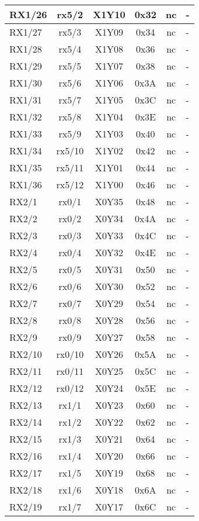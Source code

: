 \begin{longtable}{|l|c|c|c|c|l|}
RX1/26 & rx5/2  & X1Y10 & 0x32 & nc & -\\\hline
RX1/27 & rx5/3  & X1Y09 & 0x34 & nc & -\\\hline
RX1/28 & rx5/4  & X1Y08 & 0x36 & nc & -\\\hline
RX1/29 & rx5/5  & X1Y07 & 0x38 & nc & -\\\hline
RX1/30 & rx5/6  & X1Y06 & 0x3A & nc & -\\\hline
RX1/31 & rx5/7  & X1Y05 & 0x3C & nc & -\\\hline
RX1/32 & rx5/8  & X1Y04 & 0x3E & nc & -\\\hline
RX1/33 & rx5/9  & X1Y03 & 0x40 & nc & -\\\hline
RX1/34 & rx5/10 & X1Y02 & 0x42 & nc & -\\\hline
RX1/35 & rx5/11 & X1Y01 & 0x44 & nc & -\\\hline
RX1/36 & rx5/12 & X1Y00 & 0x46 & nc & -\\\hline
RX2/1  & rx0/1  & X0Y35 & 0x48 & nc & -\\\hline
RX2/2  & rx0/2  & X0Y34 & 0x4A & nc & -\\\hline
RX2/3  & rx0/3  & X0Y33 & 0x4C & nc & -\\\hline
RX2/4  & rx0/4  & X0Y32 & 0x4E & nc & -\\\hline
RX2/5  & rx0/5  & X0Y31 & 0x50 & nc & -\\\hline
RX2/6  & rx0/6  & X0Y30 & 0x52 & nc & -\\\hline
RX2/7  & rx0/7  & X0Y29 & 0x54 & nc & -\\\hline
RX2/8  & rx0/8  & X0Y28 & 0x56 & nc & -\\\hline
RX2/9  & rx0/9  & X0Y27 & 0x58 & nc & -\\\hline
RX2/10 & rx0/10 & X0Y26 & 0x5A & nc & -\\\hline
RX2/11 & rx0/11 & X0Y25 & 0x5C & nc & -\\\hline
RX2/12 & rx0/12 & X0Y24 & 0x5E & nc & -\\\hline
RX2/13 & rx1/1  & X0Y23 & 0x60 & nc & -\\\hline
RX2/14 & rx1/2  & X0Y22 & 0x62 & nc & -\\\hline
RX2/15 & rx1/3  & X0Y21 & 0x64 & nc & -\\\hline
RX2/16 & rx1/4  & X0Y20 & 0x66 & nc & -\\\hline
RX2/17 & rx1/5  & X0Y19 & 0x68 & nc & -\\\hline
RX2/18 & rx1/6  & X0Y18 & 0x6A & nc & -\\\hline
RX2/19 & rx1/7  & X0Y17 & 0x6C & nc & -\\\hline

\end{longtable}
